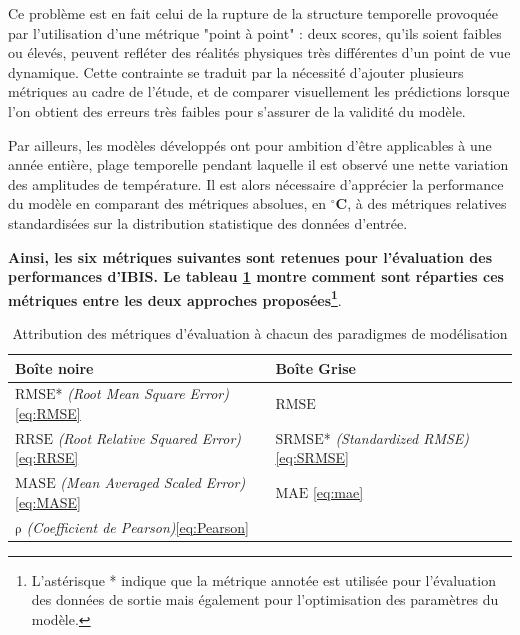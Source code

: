             Ce problème est en fait celui de la rupture de la structure temporelle provoquée par l'utilisation d'une métrique "point à point" : deux scores, qu'ils soient faibles ou élevés, peuvent refléter des réalités physiques très différentes d'un point de vue dynamique.
            Cette contrainte se traduit par la nécessité d'ajouter plusieurs métriques au cadre de l'étude, et de comparer visuellement les prédictions lorsque l'on obtient des erreurs très faibles pour s'assurer de la validité du modèle.

            Par ailleurs, les modèles développés ont pour ambition d'être applicables à une année entière, plage temporelle pendant laquelle il est observé une nette variation des amplitudes de température.
            Il est alors nécessaire d'apprécier la performance du modèle en comparant des métriques absolues, en $^\circ\mathbf{C}$, à des métriques relatives standardisées sur la distribution statistique des données d'entrée.

            \textbf{Ainsi, les six métriques suivantes sont retenues pour l'évaluation des performances d'IBIS. Le tableau \ref{tab:metriquescompare} montre comment sont réparties ces métriques entre les deux approches proposées\footnote{L'astérisque * indique que la métrique annotée est utilisée pour l'évaluation des données de sortie mais également pour l'optimisation des paramètres du modèle.}}.

            \begin{table}[H]
                \caption{Attribution des métriques d'évaluation à chacun des paradigmes de modélisation}
                \centering
                \begin{tabular}{ll}
                    \toprule
                    \textbf{Boîte noire} & \textbf{Boîte Grise} \\
                    \midrule
                    $\mathrm{RMSE}$* \textit{(Root Mean Square Error)} \eqref{eq:RMSE} & $\mathrm{RMSE}$\\
                    $\mathrm{RRSE}$ \textit{(Root Relative Squared Error)} \eqref{eq:RRSE} & $\mathrm{SRMSE}$* \textit{(Standardized RMSE)} \eqref{eq:SRMSE}\\
                    $\mathrm{MASE}$ \textit{(Mean Averaged Scaled Error)}\eqref{eq:MASE} & $\mathrm{MAE}$ \eqref{eq:mae}\\
                    $\mathrm{\rho}$ \textit{(Coefficient de Pearson)}\eqref{eq:Pearson} & \\
                    \bottomrule
                \end{tabular}
                \label{tab:metriquescompare}
            \end{table}

